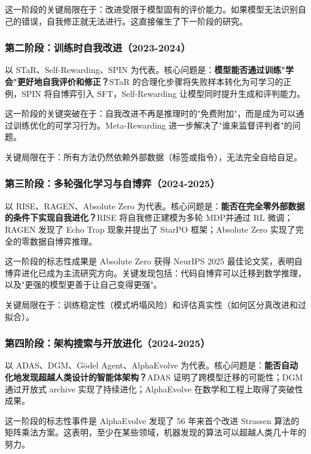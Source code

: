 这一阶段的关键局限在于：改进受限于模型固有的评价能力。如果模型无法识别自己的错误，自我修正就无法进行。这直接催生了下一阶段的研究。

\subsubsection{第二阶段：训练时自我改进（2023-2024）}

以 STaR、Self-Rewarding、SPIN 为代表。核心问题是：\textbf{模型能否通过训练"学会"更好地自我评价和修正？}STaR 的合理化步骤将失败样本转化为可学习的正例，SPIN 将自博弈引入 SFT，Self-Rewarding 让模型同时提升生成和评判能力。

这一阶段的关键突破在于：自我改进不再是推理时的"免费附加"，而是成为可以通过训练优化的可学习行为。Meta-Rewarding 进一步解决了"谁来监督评判者"的问题。

关键局限在于：所有方法仍然依赖外部数据（标签或指令），无法完全自给自足。

\subsubsection{第三阶段：多轮强化学习与自博弈（2024-2025）}

以 RISE、RAGEN、Absolute Zero 为代表。核心问题是：\textbf{能否在完全零外部数据的条件下实现自我进化？}RISE 将自我修正建模为多轮 MDP并通过 RL 微调；RAGEN 发现了 Echo Trap 现象并提出了 StarPO 框架；Absolute Zero 实现了完全的零数据自博弈推理。

这一阶段的标志性成果是 Absolute Zero 获得 NeurIPS 2025 最佳论文奖，表明自博弈进化已成为主流研究方向。关键发现包括：代码自博弈可以迁移到数学推理，以及"更强的模型更善于让自己变得更强"。

关键局限在于：训练稳定性（模式坍塌风险）和评估真实性（如何区分真改进和过拟合）。

\subsubsection{第四阶段：架构搜索与开放进化（2024-2025）}

以 ADAS、DGM、Gödel Agent、AlphaEvolve 为代表。核心问题是：\textbf{能否自动化地发现超越人类设计的智能体架构？}ADAS 证明了跨模型迁移的可能性；DGM 通过开放式 archive 实现了持续进化；AlphaEvolve 在数学和工程上取得了突破性成果。

这一阶段的标志性事件是 AlphaEvolve 发现了 56 年来首个改进 Strassen 算法的矩阵乘法方案。这表明，至少在某些领域，机器发现的算法可以超越人类几十年的努力。

